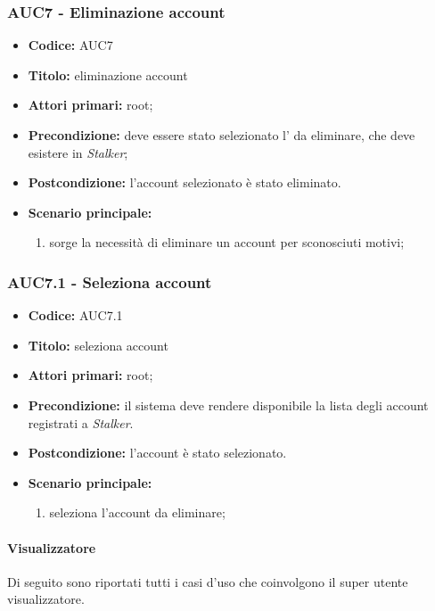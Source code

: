 \documentclass[casi-duso]{subfiles}
\begin{document}
\subsubsection{AUC7 - Eliminazione account}%
\label{subsub:AUC7}
\begin{itemize}
  \item \textbf{Codice:} AUC7
  \item \textbf{Titolo:} eliminazione account
  \item \textbf{Attori primari:} root;
  \item \textbf{Precondizione:} deve essere stato selezionato l' da eliminare, che deve esistere in \emph{Stalker};
  \item \textbf{Postcondizione:} l'account selezionato è stato eliminato.
  \item \textbf{Scenario principale:}
  \begin{enumerate}
    \item sorge la necessità di eliminare un account per sconosciuti motivi;
  \end{enumerate}
\end{itemize}


\subsubsection{AUC7.1 - Seleziona account}%
\label{subsub:AUC7.1}
\begin{itemize}
  \item \textbf{Codice:} AUC7.1
  \item \textbf{Titolo:} seleziona account
  \item \textbf{Attori primari:} root;
  \item \textbf{Precondizione:} il sistema deve rendere disponibile la lista degli account registrati a \emph{Stalker}.
  \item \textbf{Postcondizione:} l'account è stato selezionato.
  \item \textbf{Scenario principale:}
  \begin{enumerate}
    \item {} seleziona l'account da eliminare;
  \end{enumerate}
\end{itemize}

\paragraph{Visualizzatore}
Di seguito sono riportati tutti i casi d'uso che coinvolgono il super utente visualizzatore.
\end{document}
